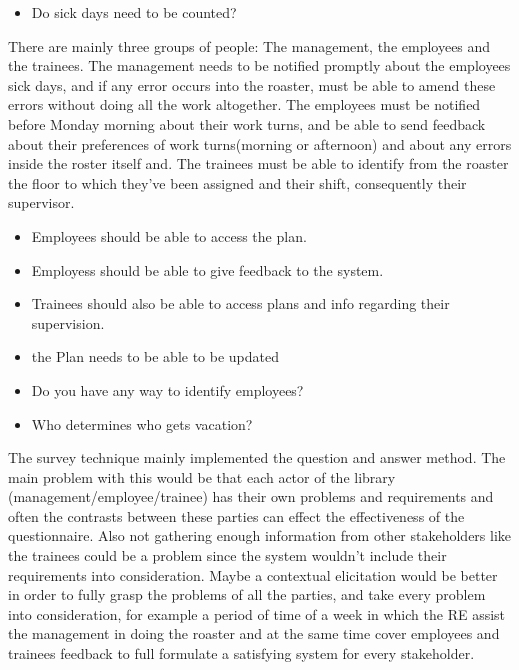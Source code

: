 \begin{elenco}
\begin{itemize}
		\item Do sick days need to be counted?
	\end{itemize}
	\item There are mainly three groups of people: The management, the employees and the trainees. The management needs to be notified promptly about the employees sick days, and if any error occurs into the roaster, must be able to amend these errors without doing all the work altogether. The employees must be notified before Monday morning about their work turns, and be able to send feedback about their preferences of work turns(morning or afternoon) and about any errors inside the roster itself and. The trainees must be able to identify from the roaster the floor to which they've been assigned and their shift, consequently their supervisor. 
	\begin{itemize}
		\item Employees should be able to access the plan.
		\item Employess should be able to give feedback to the system.
		\item Trainees should also be able to access plans and info regarding their supervision.
		\item the Plan needs to be able to be updated
	\end{itemize}
	\item 
	\begin{itemize}
	\item Do you have any way to identify employees? 
	\item Who determines who gets vacation?
	\end{itemize}
	\item The survey technique mainly implemented the question and answer method. The main problem with this would be that each actor of the library (management/employee/trainee) has their own problems and requirements and often the contrasts between these parties can effect the effectiveness of the questionnaire. Also not gathering enough information from other stakeholders like the trainees could be a problem since the system wouldn't include their requirements into consideration. Maybe a contextual elicitation would be better in order to fully grasp the problems of all the parties, and take every problem into consideration, for example a period of time of a week in which the RE assist the management in doing the roaster and at the same time cover employees and trainees feedback to full formulate a satisfying system for every stakeholder.
\end{elenco}
